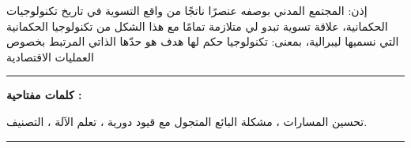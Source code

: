 \medskip

\begin{Arabic}
    إذن: المجتمع المدني بوصفه عنصرًا ناتجًا من واقع التسوية في تاريخ تكنولوجيات الحكمانية، علاقة تسوية تبدو لي متلازمة تمامًا مع هذا الشكل من تكنولوجيا الحكمانية التي نسميها ليبرالية، بمعنى: تكنولوجيا حكم لها هدف هو حدّها الذاتي المرتبط بخصوص العمليات الاقتصادية
\end{Arabic}

\medskip

\vspace{3cm}

\noindent\rule[2pt]{\textwidth}{0.5pt}

\begin{Arabic}
    \textbf{كلمات مفتاحية :}

    تحسين المسارات ، مشكلة البائع المتجول مع قيود دورية ، تعلم الآلة ، التصنيف.

\end{Arabic}

\noindent\rule[2pt]{\textwidth}{0.5pt}

